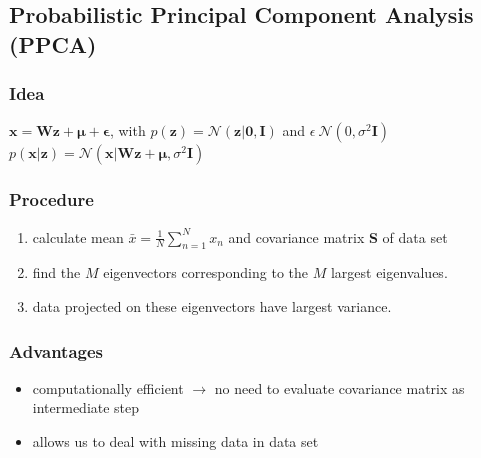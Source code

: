 \documentclass[9pt,parskip]{scrartcl}
\begin{document}
\begin{multicols*}{4}
\subsection*{Probabilistic Principal Component Analysis (PPCA)}
\subsubsection*{Idea}
$\mathbf{x} = \mathbf{Wz} + \boldsymbol{\mu} + \boldsymbol{\epsilon} $, with $p(\mathbf{z}) = \mathcal{N}(\mathbf{z}|\mathbf{0,I})$ and $\epsilon ~ \mathcal{N}(0, \sigma^2\mathbf{I})$ \\
$p(\mathbf{x}|\mathbf{z}) = \mathcal{N}(\mathbf{x}|\mathbf{Wz} + \boldsymbol{\mu}, \sigma^2\mathbf{I}) $
\subsubsection*{Procedure}
\begin{enumerate}
	\item calculate mean $\bar{x} = \frac 1 N \sum_{n=1}^{N}x_n$ and covariance matrix \textbf{S} of data set
	\item find the $M$ eigenvectors corresponding to the $M$ largest eigenvalues.
	\item data projected on these eigenvectors have largest variance.
\end{enumerate}
\subsubsection*{Advantages}
\begin{itemize}
	\item computationally efficient $\to$ no need to evaluate covariance matrix as intermediate step
	\item allows us to deal with missing data in data set
\end{itemize}



\end{multicols*}
\end{document}

